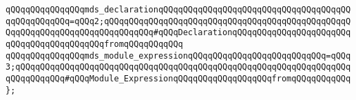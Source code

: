 \verb|qQQqqQQqqQQqqQQqmds_declarationqQQqqQQqqQQqqQQqqQQqqQQqqQQqqQQqqQQqqQQqqQQqqQQqqQQq=qQQq2;qQQqqQQqqQQqqQQqqQQqqQQqqQQqqQQqqQQqqQQqqQQqqQQqqQQqqQQqqQQqqQQqqQQqqQQqqQQqqQQq#qQQqDeclarationqQQqqQQqqQQqqQQqqQQqqQQqqQQqqQQqqQQqqQQqqQQqfromqQQqqQQqqQQq|\newline
\verb|qQQqqQQqqQQqqQQqmds_module_expressionqQQqqQQqqQQqqQQqqQQqqQQqqQQq=qQQq3;qQQqqQQqqQQqqQQqqQQqqQQqqQQqqQQqqQQqqQQqqQQqqQQqqQQqqQQqqQQqqQQqqQQqqQQqqQQqqQQq#qQQqModule_ExpressionqQQqqQQqqQQqqQQqqQQqfromqQQqqQQqqQQq|\newline
\verb|};|\newline

